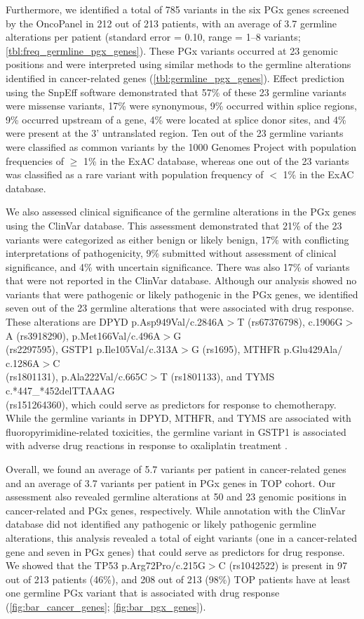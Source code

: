 Furthermore, we identified a total of 785 variants in the six PGx genes screened by the OncoPanel in 212 out of 213 patients, with an average of 3.7 germline alterations per patient (standard error = 0.10, range = 1--8 variants; \autoref{tbl:freq_germline_pgx_genes}). These PGx variants occurred at 23 genomic positions and were interpreted using similar methods to the germline alterations identified in cancer-related genes (\autoref{tbl:germline_pgx_genes}). Effect prediction using the SnpEff software demonstrated that 57\% of these 23 germline variants were missense variants, 17\% were synonymous, 9\% occurred within splice regions, 9\% occurred upstream of a gene, 4\% were located at splice donor sites, and 4\% were present at the 3' untranslated region. Ten out of the 23 germline variants were classified as common variants by the 1000 Genomes Project with population frequencies of $\geq$ 1\% in the ExAC database, whereas one out of the 23 variants was classified as a rare variant with population frequency of $<$ 1\% in the ExAC database.

We also assessed clinical significance of the germline alterations in the PGx genes using the ClinVar database. This assessment demonstrated that 21\% of the 23 variants were categorized as either benign or likely benign, 17\% with conflicting interpretations of pathogenicity, 9\% submitted without assessment of clinical significance, and 4\% with uncertain significance. There was also 17\% of variants that were not reported in the ClinVar database. Although our analysis showed no variants that were pathogenic or likely pathogenic in the PGx genes, we identified seven out of the 23 germline alterations that were associated with drug response. These alterations are DPYD p.Asp949Val$/$c.2846A$>$T (rs67376798), c.1906G$>$A (rs3918290), p.Met166Val$/$c.496A$>$G \\(rs2297595), GSTP1 p.Ile105Val$/$c.313A$>$G (rs1695), MTHFR p.Glu429Ala$/$c.1286A$>$C \\(rs1801131), p.Ala222Val$/$c.665C$>$T (rs1801133), and TYMS c.*447\_*452delTTAAAG \\(rs151264360), which could serve as predictors for response to chemotherapy. While the germline variants in DPYD, MTHFR, and TYMS are associated with fluoropyrimidine-related toxicities, the germline variant in GSTP1 is associated with adverse drug reactions in response to oxaliplatin treatment \cite{}.

Overall, we found an average of 5.7 variants per patient in cancer-related genes and an average of 3.7 variants per patient in PGx genes in TOP cohort. Our assessment also revealed germline alterations at 50 and 23 genomic positions in cancer-related and PGx genes, respectively. While annotation with the ClinVar database did not identified any pathogenic or likely pathogenic germline alterations, this analysis revealed a total of eight variants (one in a cancer-related gene and seven in PGx genes) that could serve as predictors for drug response. We showed that the TP53 p.Arg72Pro$/$c.215G$>$C (rs1042522) is present in 97 out of 213 patients (46\%), and 208 out of 213 (98\%) TOP patients have at least one germline PGx variant that is associated with drug response (\autoref{fig:bar_cancer_genes}; \autoref{fig:bar_pgx_genes}).


